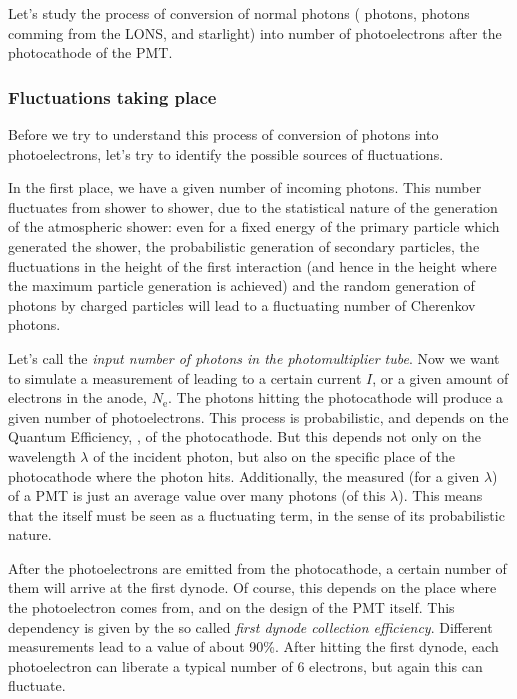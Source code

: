 Let's study the process of conversion of normal photons (\Cherenkov
photons, photons comming from the LONS, and starlight) into number of
photoelectrons after the photocathode of the PMT.

\subsubsection{Fluctuations taking place}

Before we try to understand this process of conversion of \Cherenkov
photons into photoelectrons, let's try to identify the possible
sources of fluctuations.

In the first place, we have a given number of incoming \Cherenkov
photons. This number fluctuates from shower to shower, due to the
statistical nature of the generation of the atmospheric shower: even
for a fixed energy of the primary particle which generated the shower,
the probabilistic generation of secondary particles, the fluctuations
in the height of the first interaction (and hence in the height where
the maximum particle generation is achieved) and the random generation
of \Cherenkov photons by charged particles will lead to a fluctuating
number of Cherenkov photons.

Let's call \Nphot the \emph{input number of photons in the
  photomultiplier tube}. Now we want to simulate a measurement of
\Nphot leading to a certain current $I$, or a given amount of
electrons in the anode, $N_{\mathrm{e}}$. The \Cherenkov photons
hitting the photocathode will produce a given number of
photoelectrons. This process is probabilistic, and depends on the
Quantum Efficiency, \QE, of the photocathode.  But this \QE depends
not only on the wavelength $\lambda$ of the incident photon, but also
on the specific place of the photocathode where the photon hits.
Additionally, the measured \QE (for a given $\lambda$) of a PMT is
just an average value over many photons (of this $\lambda$). This
means that the \QE itself must be seen as a fluctuating term, in the
sense of its probabilistic nature.

After the photoelectrons are emitted from the photocathode, a certain
number of them will arrive at the first dynode. Of course, this
depends on the place where the photoelectron comes from, and on the
design of the PMT itself. This dependency is given by the so called
\emph{first dynode collection efficiency}. Different measurements lead
to a value of about 90\%. After hitting the first dynode, each
photoelectron can liberate a typical number of 6 electrons, but again
this can fluctuate.

